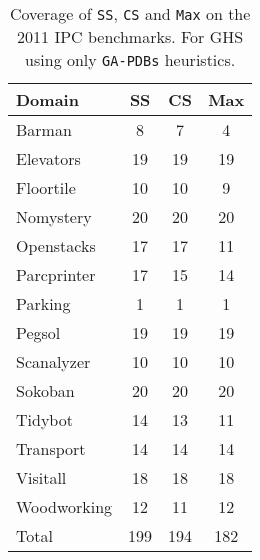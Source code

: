 \begin{table}[]
\centering
\caption{Coverage of \texttt{SS}, \texttt{CS} and \texttt{Max} on the 2011 IPC benchmarks. For GHS using only \texttt{GA-PDBs} heuristics.}
\label{my-label}
\begin{tabular}{lccc}
\hline
Domain      & SS & CS & Max \\ \hline
Barman      & 8          & 7          & 4           \\
Elevators   & 19         & 19         & 19          \\
Floortile   & 10         & 10         & 9           \\
Nomystery   & 20         & 20         & 20          \\
Openstacks  & 17         & 17         & 11          \\
Parcprinter & 17         & 15         & 14          \\
Parking     & 1          & 1          & 1           \\
Pegsol      & 19         & 19         & 19          \\
Scanalyzer  & 10         & 10         & 10          \\
Sokoban     & 20         & 20         & 20          \\
Tidybot     & 14         & 13         & 11          \\
Transport   & 14         & 14         & 14          \\
Visitall    & 18         & 18         & 18          \\
Woodworking & 12         & 11         & 12          \\ \hline
Total       & 199        & 194        & 182         \\ \hline
\end{tabular}
\label{tb_onlygapdbs}
\end{table}


